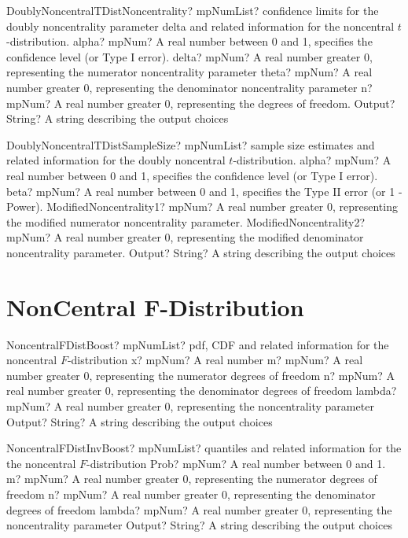 \documentclass[12pt,a4paper,openany]{book}
\begin{document}
\begin{mpFunctionsExtract}
\mpFunctionFiveNotImplemented
{DoublyNoncentralTDistNoncentrality? mpNumList? confidence limits for the doubly noncentrality parameter delta and related information for the noncentral $t$-distribution.}
{alpha? mpNum? A real number between 0 and 1, specifies the confidence level (or Type I error).}
{delta? mpNum? A real number greater 0, representing the numerator noncentrality parameter}
{theta? mpNum? A real number greater 0, representing the denominator noncentrality parameter}
{n? mpNum? A real number greater 0, representing the degrees of freedom.}
{Output? String? A string describing the output choices}
\end{mpFunctionsExtract}

\begin{mpFunctionsExtract}
\mpFunctionFiveNotImplemented
{DoublyNoncentralTDistSampleSize? mpNumList? sample size estimates and related information for the doubly noncentral $t$-distribution.}
{alpha? mpNum? A real number between 0 and 1, specifies the confidence level (or Type I error).}
{beta? mpNum?  A real number between 0 and 1, specifies the Type II error (or 1 - Power).}
{ModifiedNoncentrality1? mpNum? A real number greater 0, representing the modified numerator noncentrality parameter.}
{ModifiedNoncentrality2? mpNum? A real number greater 0, representing the modified denominator noncentrality parameter.}
{Output? String? A string describing the output choices}
\end{mpFunctionsExtract}

\section{NonCentral F-Distribution}

\begin{mpFunctionsExtract}
\mpFunctionFiveNotImplemented
{NoncentralFDistBoost? mpNumList? pdf, CDF and related information for the noncentral $F$-distribution}
{x? mpNum? A real number}
{m? mpNum? A real number greater 0, representing the numerator  degrees of freedom}
{n? mpNum? A real number greater 0, representing the denominator degrees of freedom}
{lambda? mpNum? A real number greater 0, representing the noncentrality parameter}
{Output? String? A string describing the output choices}
\end{mpFunctionsExtract}

\begin{mpFunctionsExtract}
\mpFunctionFiveNotImplemented
{NoncentralFDistInvBoost? mpNumList? quantiles and related information for the the noncentral $F$-distribution}
{Prob? mpNum? A real number between 0 and 1.}
{m? mpNum? A real number greater 0, representing the numerator  degrees of freedom}
{n? mpNum? A real number greater 0, representing the denominator degrees of freedom}
{lambda? mpNum? A real number greater 0, representing the noncentrality parameter}
{Output? String? A string describing the output choices}
\end{mpFunctionsExtract}
\end{document}
